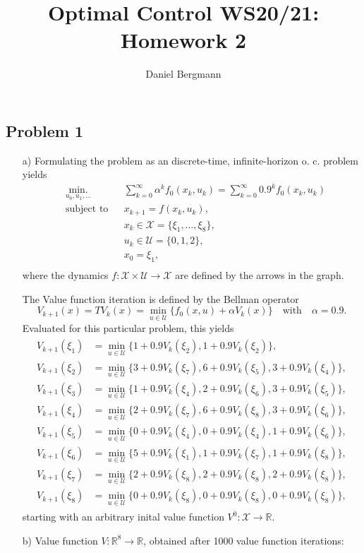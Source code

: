 \documentclass[]{article}
\title{Optimal Control WS20/21: Homework 2}
\author{Daniel Bergmann}
\newcommand{\xnull}{x_0}
\newcommand{\xk}{x_k}
\newcommand{\uk}{u_k}
\newcommand{\xkplus}{x_{k+1}}
\newcommand{\R}{\mathbb{R}}
\newcommand{\fnull}{f_0}
\newcommand{\X}{\mathcal{X}}
\newcommand{\U}{\mathcal{U}}
\newcommand{\writeset}[1]{\{#1\}}
\newcommand{\Vk}{V_k}
\newcommand{\Vind}[1]{V^#1}
\newcommand{\Vnull}{\Vind{0}}
\newcommand{\Vkplus}{V_{k+1}}
\newcommand{\minVit}[6]{\min_{u \in \U} \writeset{#1+0.9\Vk(\xi_{#2}), #3+0.9\Vk(\xi_{#4}),#5+0.9\Vk(\xi_#6) }}
\begin{document}
\maketitle

\subsection*{Problem 1}
		\begin{enumerate}
			\item[a)] Formulating the problem as an discrete-time, infinite-horizon o. c. problem yields
				\begin{equation}
				\begin{aligned}
				& \underset{u_0,u_1,\dots}{\text{min.}}
				& & \sum_{k=0}^{\infty}\alpha^k \fnull(\xk,\uk) = \sum_{k=0}^{\infty}  0.9^k \fnull(\xk,\uk)\\
				& \text{subject to}
				& & \xkplus = f(\xk,\uk),\\
				& & & \xk \in \X = \writeset{\xi_1,\dots,\xi_8},\\
				& & & \uk \in \U = \writeset{0,1,2},\\
				& & &\xnull = \xi_1,\\ 
				\end{aligned}
				\end{equation}
				where the dynamics $ f: \X \times \U \longrightarrow \X $ are defined by the arrows in the graph.
				
				The Value function iteration is defined by the Bellman operator
				\begin{equation} \label{eq:BellmanOp}
					\Vkplus(x) = T\Vk(x) = \underset{u \in \U}{\min} \writeset{\fnull(x,u) + \alpha \Vk(x)}  \quad \text{with} \quad \alpha= 0.9.
				\end{equation}
				Evaluated for this particular problem, this yields
				\begin{align}
					\begin{split}
						\Vkplus(\xi_1) &= \min_{u \in \U} \writeset{1+0.9 \Vk(\xi_2),1+0.9\Vk(\xi_2)},\\
						\Vkplus(\xi_2) &= \min_{u \in \U} \writeset{3+0.9 \Vk(\xi_7),6+0.9\Vk(\xi_5),3+0.9\Vk(\xi_4)},\\
						\Vkplus(\xi_3) &= \min_{u \in \U} \writeset{1+0.9\Vk(\xi_4), 2+0.9\Vk(\xi_6),3+0.9\Vk(\xi_5) },\\
						\Vkplus(\xi_4) &= \minVit{2}{7}{6}{8}{3}{6},\\
						\Vkplus(\xi_5) &= \minVit{0}{4}{0}{4}{1}{6},\\
						\Vkplus(\xi_6) &= \minVit{5}{1}{1}{7}{1}{8},\\
						\Vkplus(\xi_7) &= \minVit{2}{8}{2}{8}{2}{8},\\
						\Vkplus(\xi_8) &= \minVit{0}{8}{0}{8}{0}{8},
					\end{split}
				\end{align}
				starting with an arbitrary inital value function $ \Vnull: \X \longrightarrow \R $.
			\item[b)]
				Value function $ V:\R^8 \longrightarrow \R $, obtained after 1000 value function iterations:\\
				

\end{enumerate}
\end{document}
